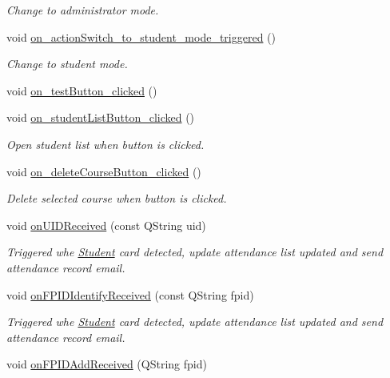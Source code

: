 \begin{DoxyCompactItemize}
\begin{DoxyCompactList}\small\item\em Change to administrator mode. \end{DoxyCompactList}\item 
void \hyperlink{class_main_window_aafa2658cd70c8c0c7bda3033e3ea40c9}{on\+\_\+action\+Switch\+\_\+to\+\_\+student\+\_\+mode\+\_\+triggered} ()
\begin{DoxyCompactList}\small\item\em Change to student mode. \end{DoxyCompactList}\item 
void \hyperlink{class_main_window_a310da50ca415fb33ba5ea524198d34f9}{on\+\_\+test\+Button\+\_\+clicked} ()
\item 
void \hyperlink{class_main_window_a617480870497fabb561137928b2231e6}{on\+\_\+student\+List\+Button\+\_\+clicked} ()
\begin{DoxyCompactList}\small\item\em Open student list when button is clicked. \end{DoxyCompactList}\item 
void \hyperlink{class_main_window_aae46cc5898251c119f8dcd282d4e2539}{on\+\_\+delete\+Course\+Button\+\_\+clicked} ()
\begin{DoxyCompactList}\small\item\em Delete selected course when button is clicked. \end{DoxyCompactList}\item 
void \hyperlink{class_main_window_ac8e92844161faf8c2dd4a11e69a57b11}{on\+U\+I\+D\+Received} (const Q\+String uid)
\begin{DoxyCompactList}\small\item\em Triggered whe \hyperlink{struct_student}{Student} card detected, update attendance list updated and send attendance record email. \end{DoxyCompactList}\item 
void \hyperlink{class_main_window_a12c1711cb7ef466a1ccb9d31fc6e2657}{on\+F\+P\+I\+D\+Identify\+Received} (const Q\+String fpid)
\begin{DoxyCompactList}\small\item\em Triggered whe \hyperlink{struct_student}{Student} card detected, update attendance list updated and send attendance record email. \end{DoxyCompactList}\item 
void \hyperlink{class_main_window_a48b5324cb6ef02b6153ef22da4304fe2}{on\+F\+P\+I\+D\+Add\+Received} (Q\+String fpid)

\end{DoxyCompactItemize}
